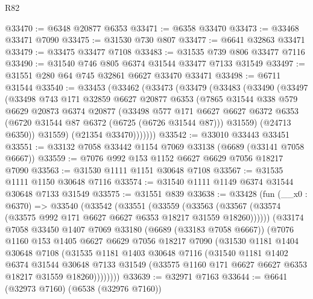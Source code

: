 \begin{lexlean}{R82}
\begin{coremodule}
@33470 := @6348 @20877 @6353
@33471 := @6358 @33470
@33473 := @33468 @33471 @7090
@33475 := @31530 @730 @807
@33477 := @6641 @32863 @33471
@33479 := @33475 @33477 @7108
@33483 := @31535 @739 @806 @33477 @7116
@33490 := @31540 @746 @805 @6374 @31544 @33477 @7133 @31549
@33497 := @31551 @280 @64 @745 @32861 @6627 @33470 @33471
@33498 := @6711 @31544
@33540 := @33453
    (@33462
      (@33473
        (@33479
          (@33483
            (@33490
              (@33497
                (@33498
                  @743
                  @171
                  @32859
                  @6627
                  @20877
                  @6353
                  (@7865
                    @31544
                    @338
                    @579
                    @6629
                    @20873
                    @6374
                    @20877
                    (@33498
                      @577
                      @171
                      @6627
                      @6627
                      @6372
                      @6353
                      (@6720 @31544 @87 @6372 (@6725 (@6726 @31544 @87)))
                      @31559)
                    (@24713 @6350))
                  @31559)
                (@21354 @33470)))))))
@33542 := @33010 @33443 @33451
@33551 := @33132 @7058 @33442 @1154 @7069 @33138 (@6689 (@33141 @7058 @6667))
@33559 := @7076 @992 @153 @1152 @6627 @6629 @7056 @18217 @7090
@33563 := @31530 @1111 @1151 @30648 @7108
@33567 := @31535 @1111 @1150 @30648 @7116
@33574 := @31540 @1111 @1149 @6374 @31544 @30648 @7133 @31549
@33575 := @31551 @839
@33638 := @33428
    (fun (__x0 : @6370) =>
    @33540
      (@33542
        (@33551
          (@33559
            (@33563 (@33567 (@33574 (@33575 @992 @171 @6627 @6627 @6353 @18217 @31559 @18260))))))
        (@33174
          @7058
          @33450
          @1407
          @7069
          @33180
          (@6689 (@33183 @7058 @6667))
          (@7076
            @1160
            @153
            @1405
            @6627
            @6629
            @7056
            @18217
            @7090
            (@31530
              @1181
              @1404
              @30648
              @7108
              (@31535
                @1181
                @1403
                @30648
                @7116
                (@31540
                  @1181
                  @1402
                  @6374
                  @31544
                  @30648
                  @7133
                  @31549
                  (@33575 @1160 @171 @6627 @6627 @6353 @18217 @31559 @18260))))))))
@33639 := @32971 @7163
@33644 := @6641 (@32973 @7160) (@6538 (@32976 @7160))

\end{coremodule}
\end{lexlean}

